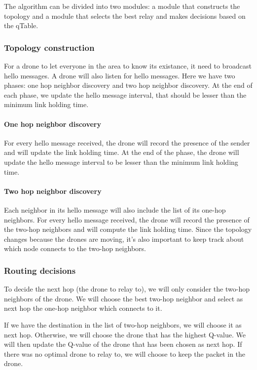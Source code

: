 The algorithm can be divided into two modules: a module that constructs the topology and a module that selects the best relay and makes decisions based on the qTable.

\subsubsection{Topology construction}

For a drone to let everyone in the area to know its existance, it need to broadcast hello messages.
A drone will also listen for hello messages.
Here we have two phases: one hop neighbor discovery and two hop neighbor discovery.
At the end of each phase, we update the hello message interval, that should be lesser than
the minimum link holding time.

\paragraph{One hop neighbor discovery}
For every hello message received, the drone will record the presence of the sender and
will update the link holding time. At the end of the phase, the drone will update the
hello message interval to be lesser than the minimum link holding time.

\paragraph{Two hop neighbor discovery}
Each neighbor in its hello message will also include the list of its one-hop neighbors.
For every hello message received, the drone will record the presence of the two-hop neighbors and will compute the link holding time.
Since the topology changes because the drones are moving, it's also important to keep track about which node connects to the two-hop neighbors.

\subsubsection{Routing decisions}
To decide the next hop (the drone to relay to), we will only consider the two-hop neighbors of the drone. %
We will choose the best two-hop neighbor and select as next hop the one-hop neighbor which connects to it.

If we have the destination in the list of two-hop neighbors, we will choose it as next hop.
Otherwise, we will choose the drone that has the highest Q-value.
We will then update the Q-value of the drone that has been chosen as next hop.
If there was no optimal drone to relay to, we will choose to keep the packet in the drone.




